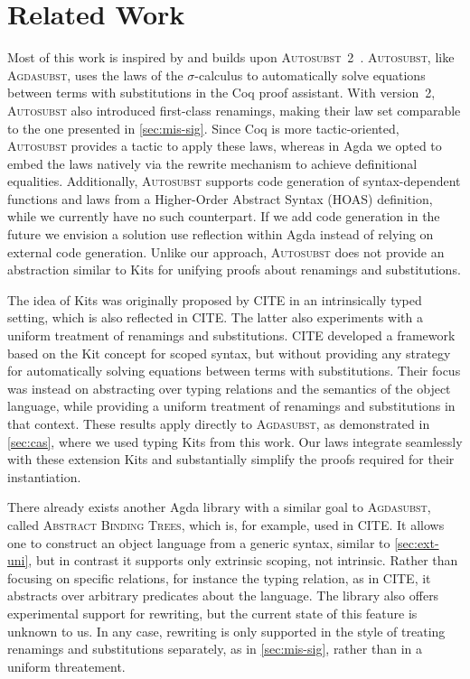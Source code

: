 \documentclass[screen,nonacm]{acmart}
\begin{document}
\section{Related Work}\label{sec:rel}
Most of this work is inspired by and builds upon \textsc{Autosubst~2}~\cite{CITE}. 
\textsc{Autosubst}, like \textsc{Agdasubst}, uses the laws of the $\sigma$-calculus to automatically solve equations between terms with substitutions in the Coq proof assistant. 
With version~2, \textsc{Autosubst} also introduced first-class renamings, making their law set comparable to the one presented in \cref{sec:mis-sig}. 
Since Coq is more tactic-oriented, \textsc{Autosubst} provides a tactic to apply these laws, whereas in Agda we opted to embed the laws natively via the rewrite mechanism to achieve definitional equalities. 
Additionally, \textsc{Autosubst} supports code generation of syntax-dependent functions and laws from a Higher-Order Abstract Syntax (HOAS) definition, while we currently have no such counterpart. If we add code generation in the future we envision a solution use reflection within Agda instead of relying on external code generation.
Unlike our approach, \textsc{Autosubst} does not provide an abstraction similar to Kits for unifying proofs about renamings and substitutions.

The idea of Kits was originally proposed by CITE in an intrinsically typed setting, 
which is also reflected in CITE. 
The latter also experiments with a uniform treatment of renamings and substitutions. 
CITE developed a framework based on the Kit concept for scoped syntax, 
but without providing any strategy for automatically solving equations between terms with substitutions. 
Their focus was instead on abstracting over typing relations and the semantics of the object language, 
while providing a uniform treatment of renamings and substitutions in that context. 
These results apply directly to \textsc{Agdasubst}, as demonstrated in \cref{sec:cas}, 
where we used typing Kits from this work. 
Our laws integrate seamlessly with these extension Kits and substantially simplify the proofs required for their instantiation.

There already exists another Agda library with a similar goal to \textsc{Agdasubst}, called
\textsc{Abstract Binding Trees}, which is, for example, used in CITE. 
It allows one to construct an object language from a generic syntax, similar to 
\cref{sec:ext-uni}, but in contrast it supports only extrinsic scoping, not intrinsic. 
Rather than focusing on specific relations, for instance the typing relation, as in CITE, it abstracts over arbitrary predicates about the language. 
The library also offers experimental support for rewriting, but the current state of this feature is unknown to us. 
In any case, rewriting is only supported in the style of treating renamings and substitutions separately, 
as in \cref{sec:mis-sig}, rather than in a uniform threatement.
\end{document}
